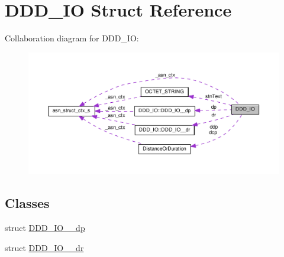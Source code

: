 \hypertarget{structDDD__IO}{}\section{D\+D\+D\+\_\+\+IO Struct Reference}
\label{structDDD__IO}


Collaboration diagram for D\+D\+D\+\_\+\+IO\+:\nopagebreak
\begin{figure}[H]
\begin{center}
\leavevmode
\includegraphics[width=350pt]{structDDD__IO__coll__graph}
\end{center}
\end{figure}
\subsection*{Classes}
\begin{DoxyCompactItemize}
\item 
struct \hyperlink{structDDD__IO_1_1DDD__IO____dp}{D\+D\+D\+\_\+\+I\+O\+\_\+\+\_\+dp}
\item 
struct \hyperlink{structDDD__IO_1_1DDD__IO____dr}{D\+D\+D\+\_\+\+I\+O\+\_\+\+\_\+dr}
\end{DoxyCompactItemize}
